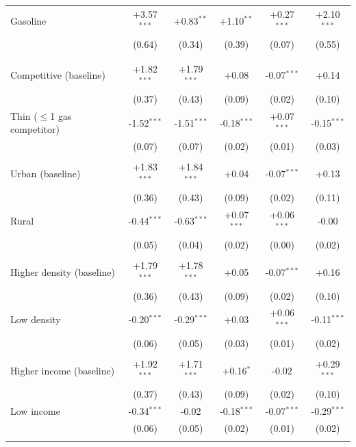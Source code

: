 \begin{tabular}{lccccc}
\quad Gasoline & +3.57$^{***}$ & +0.83$^{**}$ & +1.10$^{**}$ & +0.27$^{***}$ & +2.10$^{***}$ \\
 & (0.64) & (0.34) & (0.39) & (0.07) & (0.55) \\
\addlinespace
\multicolumn{6}{@{}l}{\textbf{Where}} \\
\addlinespace
\multicolumn{6}{@{}l}{\textit{Local competition}} \\
\quad Competitive (baseline) & +1.82$^{***}$ & +1.79$^{***}$ & +0.08 & -0.07$^{***}$ & +0.14 \\
 & (0.37) & (0.43) & (0.09) & (0.02) & (0.10) \\
\quad Thin ($\le$1 gas competitor) & -1.52$^{***}$ & -1.51$^{***}$ & -0.18$^{***}$ & +0.07$^{***}$ & -0.15$^{***}$ \\
 & (0.07) & (0.07) & (0.02) & (0.01) & (0.03) \\
\addlinespace
\multicolumn{6}{@{}l}{\textit{Rural}} \\
\quad Urban (baseline) & +1.83$^{***}$ & +1.84$^{***}$ & +0.04 & -0.07$^{***}$ & +0.13 \\
 & (0.36) & (0.43) & (0.09) & (0.02) & (0.11) \\
\quad Rural & -0.44$^{***}$ & -0.63$^{***}$ & +0.07$^{***}$ & +0.06$^{***}$ & -0.00 \\
 & (0.05) & (0.04) & (0.02) & (0.00) & (0.02) \\
\addlinespace
\multicolumn{6}{@{}l}{\textit{Population density}} \\
\quad Higher density (baseline) & +1.79$^{***}$ & +1.78$^{***}$ & +0.05 & -0.07$^{***}$ & +0.16 \\
 & (0.36) & (0.43) & (0.09) & (0.02) & (0.10) \\
\quad Low density & -0.20$^{***}$ & -0.29$^{***}$ & +0.03 & +0.06$^{***}$ & -0.11$^{***}$ \\
 & (0.06) & (0.05) & (0.03) & (0.01) & (0.02) \\
\addlinespace
\multicolumn{6}{@{}l}{\textit{Income}} \\
\quad Higher income (baseline) & +1.92$^{***}$ & +1.71$^{***}$ & +0.16$^{*}$ & -0.02 & +0.29$^{***}$ \\
 & (0.37) & (0.43) & (0.09) & (0.02) & (0.10) \\
\quad Low income & -0.34$^{***}$ & -0.02 & -0.18$^{***}$ & -0.07$^{***}$ & -0.29$^{***}$ \\
 & (0.06) & (0.05) & (0.02) & (0.01) & (0.02) \\
\addlinespace
\multicolumn{6}{@{}l}{\textit{Poverty}} \\

\end{tabular}
